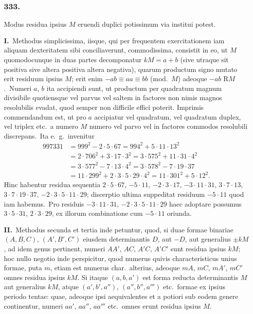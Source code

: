 \documentclass[12pt,a4paper]{article}
\theoremstyle{plain}
\theoremstyle{definition}
\theoremstyle{remark}
\begin{document}
\subsubsection*{333.}

Modus residua ipsius $M$ eruendi duplici potissimum via institui potest.

\textbf{I.}\ Methodus simplicissima, iisque, qui per frequentem exercitationem
iam aliquam dexteritatem sibi conciliaverunt, commodissima, consistit in eo,
ut $M$ quomodocunque in duas partes decomponatur $kM=a+b$ (sive utraque
sit positiva sive altera positiva altera negativa), quarum productum signo
mutato erit residuum ipsius $M$; erit enim $-ab\equiv aa\equiv bb$ (mod.\ $M$)
adeoque $-ab$ R$M$.\ Numeri $a$, $b$ ita accipiendi sunt, ut productum per
quadratum magnum divisibile quotiensque vel parvus vel saltem in factores
non nimis magnos resolubilis evadat, quod semper non difficile effici poterit.
Imprimis commendandum est, ut pro $a$ accipiatur vel quadratum, vel
quadratum duplex, vel triplex etc.\ a numero $M$ numero vel parvo vel in
factores commodos resolubili discrepans.\ Ita e.\ g.\ invenitur
\begin{align*}
997331 &= 999^2-2\cdot 5\cdot 67 = 994^2+5\cdot 11\cdot 13^2 \\
&= 2\cdot 706^2+3\cdot 17\cdot 3^2 = 3\cdot 575^2+11\cdot 31\cdot 4^2 \\
&= 3\cdot 577^2-7\cdot 13\cdot 4^2 = 3\cdot 578^2-7\cdot 19\cdot 37 \\
&= 11\cdot 299^2+2\cdot 3\cdot 5\cdot 29\cdot 4^2 = 11\cdot 301^2+5\cdot 12^2.
\end{align*}
Hinc habentur residua sequentia $2\cdot 5\cdot 67$, $-5\cdot 11$, $-2\cdot 3\cdot 17$,
$-3\cdot 11\cdot 31$, $3\cdot 7\cdot 13$, $3\cdot 7\cdot 19\cdot 37$, $-2\cdot 3\cdot 5\cdot 11\cdot 29$; discerptio
ultima suppeditat residuum $-5\cdot 11$ quod iam habemus.\ Pro residuis
$-3\cdot 11\cdot 31$, $-2\cdot 3\cdot 5\cdot 11\cdot 29$ haec adoptare possumus $3\cdot 5\cdot 31$,
$2\cdot 3\cdot 29$, ex illorum combinatione cum $-5\cdot 11$ oriunda.

\textbf{II.}\ Methodus secunda et tertia inde petuntur, quod, si duae formae
binariae $(A,B,C)$, $(A',B',C')$ eiusdem determinantis $D$, aut $-D$, aut
generalius $\pm kM$, ad idem genus pertinent, numeri $AA'$, $AC$, $A'C$,
$A'C'$ sunt residua ipsius $kM$; hoc nullo negotio inde perspicitur, quod
numerus quivis characteristicus unius formae, puta $m$, etiam est numerus
char.\ alterius, adeoque $mA$, $mC$, $mA'$, $mC'$ omnes residua ipsius $kM$.
Si itaque $(a,b,a')$ est forma reducta determinantis $M$ aut generalius
$kM$, atque $(a',b',a'')$, $(a'',b'',a''')$ etc.\ formae ex ipsius periodo tentae:
quae, adeoque ipsi aequivalentes et a potiori sub eodem genere continentur,
numeri $aa'$, $aa''$, $aa'''$ etc.\ omnes erunt residua ipsius $M$.
\end{document}
